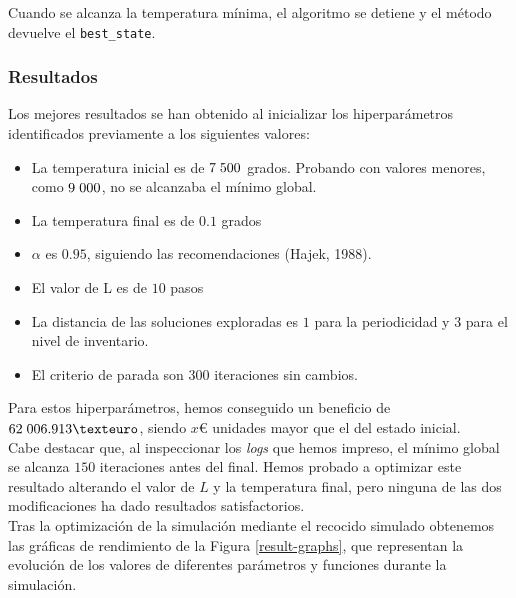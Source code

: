 \documentclass[a4paper,12pt]{article}
\begin{document}
	Cuando se alcanza la temperatura mínima, el algoritmo se detiene y el método devuelve el \texttt{best\_state}.

	
	\subsubsection{Resultados}
	Los mejores resultados se han obtenido al inicializar los hiperparámetros identificados previamente a los siguientes valores:
	\begin{itemize}
		\item La temperatura inicial es de $7\hspace{1mm}500$ grados. Probando con valores menores, como $9\hspace{1mm}000$, no se alcanzaba el mínimo global.
		\item La temperatura final es de $0.1$ grados
		\item $\alpha$ es $0.95$, siguiendo las recomendaciones (Hajek, 1988).
		\item El valor de L es de $10$ pasos
		\item La distancia de las soluciones exploradas es $1$ para la periodicidad y $3$ para el nivel de inventario.
		\item El criterio de parada son $300$ iteraciones sin cambios.
	\end{itemize}
	Para estos hiperparámetros, hemos conseguido un beneficio de $62\hspace{1mm}006.913€$, siendo $x€$ unidades mayor que el del estado inicial. \\
	
	Cabe destacar que, al inspeccionar los \textit{logs} que hemos impreso, el mínimo global se alcanza $150$ iteraciones antes del final. Hemos probado a optimizar este resultado alterando el valor de $L$ y la temperatura final, pero ninguna de las dos modificaciones ha dado resultados satisfactorios. \\
	
	
	
	
	Tras la optimización de la simulación mediante el recocido simulado obtenemos las gráficas de rendimiento de la Figura \ref{result-graphs}, que representan la evolución de los valores de diferentes parámetros y funciones durante la simulación.\\
		
\end{document}
